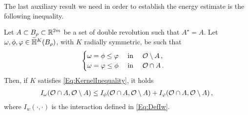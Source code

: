 The last auxiliary result we need in order to establish the energy estimate is the following inequality.

\begin{lemma}
\label{Lemma:InteractionInequalityMinimumFunction}
Let $A\subset B_\rho \subset \mathbb{R}^{2m}$ be a set of double revolution such that $A^\star = A$. Let $\omega, \phi, \varphi \in \widetilde{\mathbb{H}}^K(B_\rho)$, with $K$ radially symmetric, be such that
\begin{equation}
	\label{Eq:InteractionMinHyp}
	\begin{cases}
	\omega = \phi \leq \varphi \ \ \ \ \textrm{in } \ \ \ \mathcal{O} \setminus A\,,\\
	\omega = \varphi \leq \phi \ \ \ \ \textrm{in } \ \ \ \mathcal{O} \cap A\,.
	\end{cases}
\end{equation}
Then, if $K$ satisfies \eqref{Eq:KernelInequality}, it holds
\begin{align*}
I_\omega(\mathcal{O}\cap A, \mathcal{O} \setminus A) \leq I_\phi(\mathcal{O}\cap A, \mathcal{O} \setminus A) + I_\varphi(\mathcal{O}\cap A, \mathcal{O} \setminus A)\,,
\end{align*}
where $I_w(\cdot, \cdot)$ is the interaction defined in \eqref{Eq:DefIw}.
\end{lemma}

